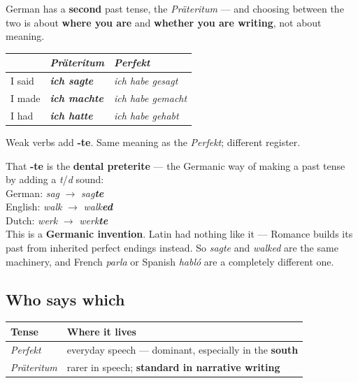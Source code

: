 German has a \textbf{second} past tense, the \emph{Pr\"{a}teritum} --- and
choosing between the two is about \textbf{where you are} and \textbf{whether you
are writing}, not about meaning.

\begin{center}
\begin{tabular}{@{}lll@{}}
\toprule
& \emph{Pr\"{a}teritum} & \emph{Perfekt} \\
\midrule
I said & \emph{\textbf{ich sagte}} & \emph{ich habe gesagt} \\
I made & \emph{\textbf{ich machte}} & \emph{ich habe gemacht} \\
I had & \emph{\textbf{ich hatte}} & \emph{ich habe gehabt} \\
\bottomrule
\end{tabular}
\end{center}

Weak verbs add \textbf{-te}. Same meaning as the \emph{Perfekt}; different
register.

\begin{morphologybox}
That \textbf{-te} is the \textbf{dental preterite} --- the Germanic way of making
a past tense by adding a \emph{t}/\emph{d} sound:\\[3pt]
German: \emph{sag} $\to$ \emph{sag\textbf{te}}\\
English: \emph{walk} $\to$ \emph{walk\textbf{ed}}\\
Dutch: \emph{werk} $\to$ \emph{werk\textbf{te}}\\[3pt]
This is a \textbf{Germanic invention}. Latin had nothing like it --- Romance
builds its past from inherited perfect endings instead. So \emph{sagte} and
\emph{walked} are the same machinery, and French \emph{parla} or Spanish
\emph{habl\'{o}} are a completely different one.
\end{morphologybox}

\subsection*{Who says which}

\begin{center}
\begin{tabular}{@{}ll@{}}
\toprule
Tense & Where it lives \\
\midrule
\emph{Perfekt} & everyday speech --- dominant, especially in the \textbf{south} \\
\emph{Pr\"{a}teritum} & rarer in speech; \textbf{standard in narrative writing} \\
\bottomrule
\end{tabular}
\end{center}

